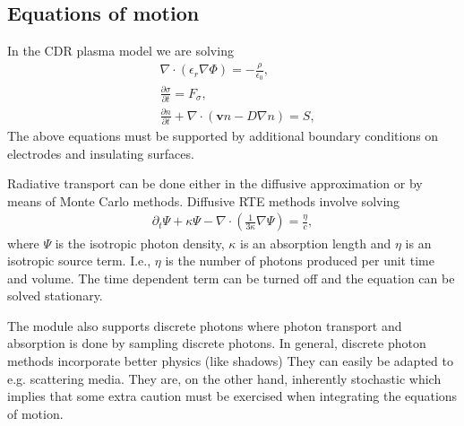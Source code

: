 \documentclass[letterpaper,10pt,english]{sphinxmanual}
\begin{document}
\subsection{Equations of motion}
\label{\detokenize{Applications/CdrPlasmaModel:equations-of-motion}}
\sphinxAtStartPar
In the CDR plasma model we are solving
\begin{equation*}
\begin{split}&\nabla\cdot\left(\epsilon_r\nabla\Phi\right) = -\frac{\rho}{\epsilon_0},\\
&\frac{\partial\sigma}{\partial t} = F_\sigma,\\
&\frac{\partial n}{\partial t} + \nabla\cdot\left(\mathbf{v} n - D\nabla n\right) = S,\end{split}
\end{equation*}
\sphinxAtStartPar
The above equations must be supported by additional boundary conditions on electrodes and insulating surfaces.

\sphinxAtStartPar
Radiative transport can be done either in the diffusive approximation or by means of Monte Carlo methods.
Diffusive RTE methods involve solving
\begin{equation*}
\begin{split}\partial_t\Psi + \kappa\Psi - \nabla\cdot\left(\frac{1}{3\kappa}\nabla\Psi\right) = \frac{\eta}{c},\end{split}
\end{equation*}
\sphinxAtStartPar
where \(\Psi\) is the isotropic photon density, \(\kappa\) is an absorption length and \(\eta\) is an isotropic source term.
I.e., \(\eta\) is the number of photons produced per unit time and volume.
The time dependent term can be turned off and the equation can be solved stationary.

\sphinxAtStartPar
The module also supports discrete photons where photon transport and absorption is done by sampling discrete photons.
In general, discrete photon methods incorporate better physics (like shadows)
They can easily be adapted to e.g. scattering media.
They are, on the other hand, inherently stochastic which implies that some extra caution must be exercised when integrating the equations of motion.
\end{document}
